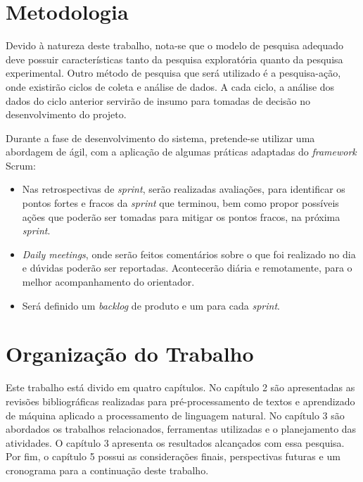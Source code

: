 \section{Metodologia}
\label{sub:metodologia}

Devido à natureza deste trabalho, nota-se que o modelo de pesquisa adequado deve possuir características tanto da pesquisa exploratória quanto da pesquisa experimental. Outro método de pesquisa que será utilizado é a pesquisa-ação, onde existirão ciclos de coleta e análise de dados. A cada ciclo, a análise dos dados do ciclo anterior servirão de insumo para tomadas de decisão no desenvolvimento do projeto.

Durante a fase de desenvolvimento do sistema, pretende-se utilizar uma abordagem de ágil, com a aplicação de algumas práticas adaptadas do \textit{framework} Scrum:

\begin{itemize}
    \item Nas retrospectivas de \textit{sprint}, serão realizadas avaliações, para identificar os pontos fortes e fracos da \textit{sprint} que terminou, bem como propor possíveis ações que poderão ser tomadas para mitigar os pontos fracos, na próxima \textit{sprint}.
    \item \textit{Daily meetings}, onde serão feitos comentários sobre o que foi realizado no dia e dúvidas poderão ser reportadas. Acontecerão diária e remotamente, para o melhor acompanhamento do orientador.
    \item Será definido um \textit{backlog} de produto e um para cada \textit{sprint}.
\end{itemize}

\section{Organização do Trabalho}
\label{sec:organização_do_trabalho}

Este trabalho está divido em quatro capítulos. No capítulo 2 são apresentadas as revisões bibliográficas realizadas para pré-processamento de textos e aprendizado de máquina aplicado a processamento de linguagem natural. No capítulo 3 são abordados os trabalhos relacionados, ferramentas utilizadas e o planejamento das atividades. O capítulo 3 apresenta os resultados alcançados com essa pesquisa. Por fim, o capítulo 5 possui as considerações finais, perspectivas futuras e um cronograma para a continuação deste trabalho.
